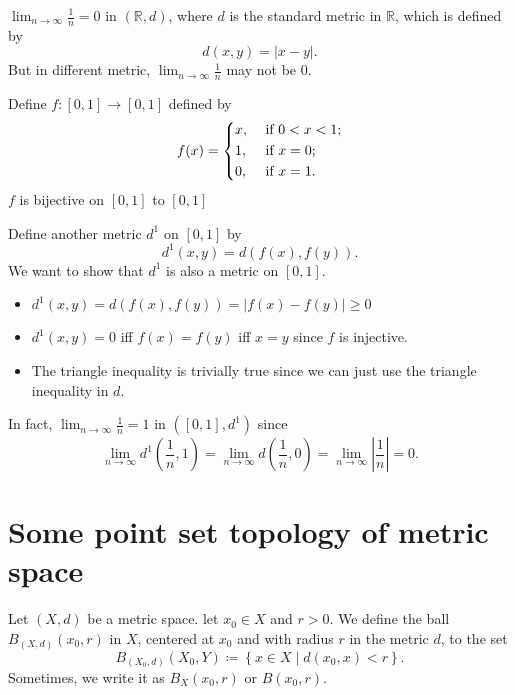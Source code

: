 \begin{eg}
    \(\lim_{n \to \infty} \frac{1}{n} = 0 \) in \((\mathbb{R} , d)\), where \(d\) is the standard metric in \(\mathbb{R} \), which is defined by 
    \[
        d(x, y) = \vert x - y \vert. 
    \]    
    But in different metric, \(\lim_{n \to \infty} \frac{1}{n} \) may not be \(0\).  
\end{eg}
\begin{explanation}
    Define \(f: [0, 1] \to [0, 1]\) defined by
\[
    f(x) = \begin{dcases}
        x, &\text{ if } 0<x<1  ;\\
        1, &\text{ if } x=0;\\
        0, &\text{ if } x=1.
    \end{dcases}
\]
\(f\) is bijective on \([0, 1]\) to \([0, 1]\)  

Define another metric \(d^1\) on \([0, 1]\) by 
\[
    d^1(x, y) = d(f(x), f(y)).
\]  
We want to show that \(d^1\) is also a metric on \([0, 1]\). 
\begin{itemize}
    \item \(d^1(x,y)=d(f(x), f(y)) = \vert f(x) - f(y) \vert \ge 0\)
    \item \(d^1(x, y) = 0\) iff \(f(x) = f(y)\) iff \(x=y\) since \(f\) is injective.  
    \item The triangle inequality is trivially true since we can just use the triangle inequality in \(d\).   
\end{itemize}  

In fact, \(\lim_{n \to \infty} \frac{1}{n} = 1 \) in \(\left( [0, 1], d^1 \right) \) since 
\[
    \lim_{n \to \infty} d^{1}\left( \frac{1}{n}, 1 \right) = \lim_{n \to \infty} d \left( \frac{1}{n}, 0 \right) = \lim_{n \to \infty} \left\vert \frac{1}{n} \right\vert = 0.      
\]  
\end{explanation}

\section{Some point set topology of metric space}
\begin{definition}[ball] \label{def: ball}
    Let \((X,d)\) be a metric space. let \(x_0 \in X\) and \(r > 0\). We define the ball \(B_{(X, d)} (x_0, r)\) in \(X\), centered at \(x_0\) and with radius \(r\) in the metric \(d\), to the set 
    \[
        B_{(X_0, d)} (X_0, Y) \coloneqq \left\{ x \in X \mid d(x_0, x) < r \right\}.
    \]
    Sometimes, we write it as \(B_X(x_0, r)\) or \(B(x_0, r)\).   
\end{definition}

